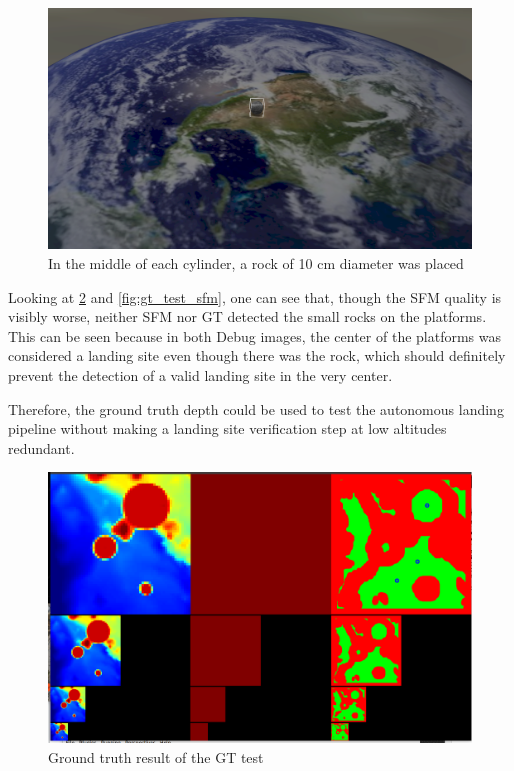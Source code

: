 \begin{figure}[ht]
\centering
\includegraphics[scale=0.195]{images/methodology/test_setup2.png}
\caption{In the middle of each cylinder, a rock of 10 cm diameter was placed}
\label{fig:gt_test_setup2}
\end{figure}

\clearpage %

Looking at \cref{fig:gt_test_gt} and \cref{fig:gt_test_sfm}, one can see that, though the SFM quality is visibly worse, neither SFM nor GT detected the small rocks on the platforms. This can be seen because in both Debug images, the center of the platforms was considered a landing site even though there was the rock, which should definitely prevent the detection of a valid landing site in the very center.

Therefore, the ground truth depth could be used to test the autonomous landing pipeline without making a landing site verification step at low altitudes redundant.

\begin{figure}[ht]
\centering
\includegraphics[scale=0.22]{images/methodology/GT.png}
\caption{Ground truth result of the GT test}
\label{fig:gt_test_gt} 
\end{figure}

